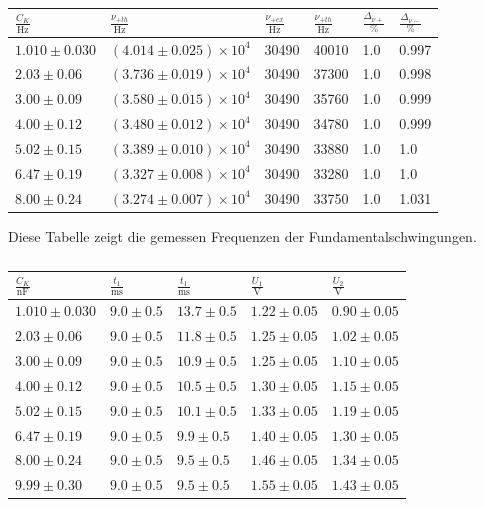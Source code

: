 \documentclass[11pt,ngerman,a4paper]{article}
\begin{document}
 \begin{table}
 \centering
\begin{tabular}{llllll}
\toprule
{$\frac{C_K}{\si{\Hz}}$} & {$\frac{\nu_{+th}}{\si{\Hz}}$} & $\frac{\nu_{+ex}}{\si{\Hz}}$ &$\frac{\nu_{+th}}{\si{\Hz}} $& $\frac{\Delta_{\nu+}}{\si{\percent}}$ &$\frac{\Delta_{\nu-}}{\si{\percent}}$\\
\midrule
 $1.010 \pm 0.030$  & $\left(4.014 \pm 0.025\right) \times 10^{4}$  & 30490 & 40010 & 1.0 & 0.997\\
 $2.03 \pm 0.06$  & $\left(3.736 \pm 0.019\right) \times 10^{4}$  & 30490 & 37300 & 1.0 & 0.998\\
 $3.00 \pm 0.09$  & $\left(3.580 \pm 0.015\right) \times 10^{4}$  & 30490 & 35760 & 1.0 & 0.999\\
 $4.00 \pm 0.12$  & $\left(3.480 \pm 0.012\right) \times 10^{4}$  & 30490 & 34780 & 1.0 & 0.999\\
 $5.02 \pm 0.15$  & $\left(3.389 \pm 0.010\right) \times 10^{4}$  & 30490 & 33880 & 1.0 & 1.0\\
 $6.47 \pm 0.19$  & $\left(3.327 \pm 0.008\right) \times 10^{4}$  & 30490 & 33280 & 1.0 & 1.0\\
 $8.00 \pm 0.24$  & $\left(3.274 \pm 0.007\right) \times 10^{4}$  & 30490 & 33750 & 1.0 & 1.031\\
\bottomrule
\end{tabular}
\label{tab4}
\caption{Diese Tabelle zeigt die gemessen Frequenzen der Fundamentalschwingungen.}

\centering
\begin{tabular}{lllll}
\toprule
{$\frac{C_K}{\si{\nano\farad}}$} &{ $\frac{t_1}{\si{\milli\second}}$} &{ $\frac{t_1}{\si{\milli\second}}$} &{ $\frac{U_1}{\si{\volt}}$} &{ $\frac{U_2}{\si{\volt}}$ }\\
\midrule
 $1.010 \pm 0.030$  & $9.0 \pm 0.5$  & $13.7 \pm 0.5$  & $1.22 \pm 0.05$  & $0.90 \pm 0.05$ \\
 $2.03 \pm 0.06$  & $9.0 \pm 0.5$  & $11.8 \pm 0.5$  & $1.25 \pm 0.05$  & $1.02 \pm 0.05$ \\
 $3.00 \pm 0.09$  & $9.0 \pm 0.5$  & $10.9 \pm 0.5$  & $1.25 \pm 0.05$  & $1.10 \pm 0.05$ \\
 $4.00 \pm 0.12$  & $9.0 \pm 0.5$  & $10.5 \pm 0.5$  & $1.30 \pm 0.05$  & $1.15 \pm 0.05$ \\
 $5.02 \pm 0.15$  & $9.0 \pm 0.5$  & $10.1 \pm 0.5$  & $1.33 \pm 0.05$  & $1.19 \pm 0.05$ \\
 $6.47 \pm 0.19$  & $9.0 \pm 0.5$  & $9.9 \pm 0.5$  & $1.40 \pm 0.05$  & $1.30 \pm 0.05$ \\
 $8.00 \pm 0.24$  & $9.0 \pm 0.5$  & $9.5 \pm 0.5$  & $1.46 \pm 0.05$  & $1.34 \pm 0.05$ \\
 $9.99 \pm 0.30$  & $9.0 \pm 0.5$  & $9.5 \pm 0.5$  & $1.55 \pm 0.05$  & $1.43 \pm 0.05$ \\
\bottomrule
\end{tabular}
\label{tab5}
\caption{}


\end{table}
\end{document}
